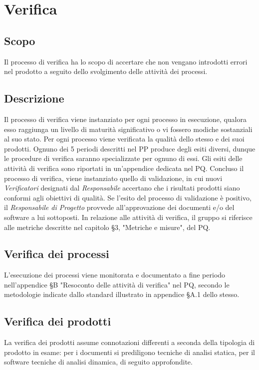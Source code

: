 \documentclass[../NormediProgetto.tex]{subfiles}
\begin{document}
	
	
	
\section{Verifica}

\subsection{Scopo}
Il processo di verifica ha lo scopo di accertare che non vengano introdotti errori nel prodotto a seguito dello svolgimento delle attività dei processi.

\subsection{Descrizione}

Il processo di verifica viene instanziato per ogni processo in esecuzione, qualora esso raggiunga un livello di maturità significativo o vi fossero modiche sostanziali al suo stato. Per ogni processo viene verificata la qualità dello stesso e dei suoi prodotti. Ognuno dei 5 periodi descritti nel PP produce degli esiti diversi, dunque le procedure di verifica saranno specializzate per ognuno di essi. Gli esiti delle attività di
verifica sono riportati in un'appendice dedicata nel PQ. Concluso il processo di verifica, viene instanziato quello di validazione, in cui nuovi \textit{Verificatori} designati dal \textit{Responsabile} accertano che i risultati prodotti siano conformi agli obiettivi di qualità. Se l'esito del processo di validazione è positivo, il \textit{Responsabile di Progetto} provvede all'approvazione dei documenti e/o del software a lui sottoposti.
In relazione alle attività di verifica, il gruppo si riferisce alle metriche descritte nel capitolo §3, "Metriche e misure", del PQ.

\subsection{Verifica dei processi} 
L'esecuzione dei processi viene monitorata e documentato a fine periodo nell'appendice §B "Resoconto delle attività di verifica" nel PQ, secondo le metodologie indicate dallo standard  illustrato in appendice §A.1 dello stesso.

\subsection{Verifica dei prodotti}
La verifica dei prodotti assume connotazioni differenti a seconda della tipologia di prodotto in esame: per i documenti si prediligono tecniche di analisi statica, per il software tecniche di analisi dinamica, di seguito approfondite.
\end{document}
